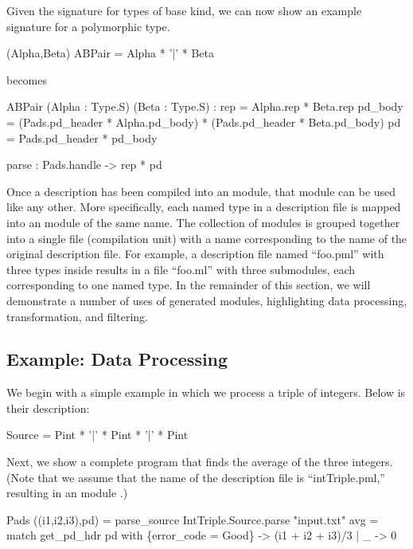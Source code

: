 Given the signature  for types of base kind, we can now
show an example signature for a polymorphic type.
\begin{code}\scriptsize
{} (Alpha,Beta) ABPair = Alpha * '|' * Beta\end{code}
becomes
\begin{code}\scriptsize
{} ABPair (Alpha : Type.S) (Beta : Type.S) :
   rep = Alpha.rep * Beta.rep
   pd\_body = (Pads.pd_header * Alpha.pd\_body) * 
                 (Pads.pd_header * Beta.pd\_body)
   pd = Pads.pd_header * pd\_body

   parse : Pads.handle -> rep * pd
\end{code}

Once a description has been compiled into an \ocaml{} module, that
module can be used like any other.  More specifically, each named type
in a description file is mapped into an \ocaml{} module of the same
name.  The collection of modules is grouped together into a
single file (compilation unit) with a name corresponding to the name
of the original description file. For example, a description file
named ``foo.pml'' with three types inside results in a file ``foo.ml''
with three submodules, each corresponding to one named type.  In the
remainder of this section, we will demonstrate a number of uses of
generated modules, highlighting data processing, transformation, and
filtering.

\subsection{Example: Data Processing}
\label{sec:ex-process}

We begin with a simple example in which we process a triple of
integers. Below is their description:
\begin{code}\scriptsize
{} Source = Pint * '|' * Pint * '|' * Pint\end{code} Next, we
show a complete \ocaml{} program that finds the average of the three
integers. (Note that we assume that the name of the description file
is ``intTriple.pml,'' resulting in an \ocaml{} module .)
\begin{code}\scriptsize
{} Pads
 ((i1,i2,i3),pd) = 
    parse_source IntTriple.Source.parse "input.txt"
 avg = match get_pd_hdr pd with
    \{error_code = Good\} -> (i1 + i2 + i3)/3
  | _ -> 0\end{code}

